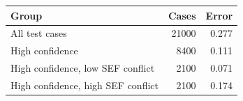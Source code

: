\begin{tabular}{lrr}
\toprule
Group & Cases & Error \\
\midrule
All test cases & 21000 & 0.277 \\
High confidence & 8400 & 0.111 \\
High confidence, low SEF conflict & 2100 & 0.071 \\
High confidence, high SEF conflict & 2100 & 0.174 \\
\bottomrule
\end{tabular}
